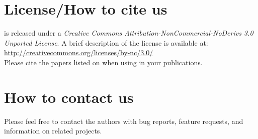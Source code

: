 
\section{License/How to cite us}
\wingj is released under a \textit{Creative Commons Attribution-NonCommercial-NoDerivs 3.0 Unported License}. A brief description of the license is available at:\\

\href{http://creativecommons.org/licenses/by-nc/3.0/}{http://creativecommons.org/licenses/by-nc/3.0/}\\

Please cite the papers listed on \wingjUrl when using \wingj in your publications.

\section{How to contact us}
Please feel free to contact the authors with bug reports, feature requests, and information on related projects.

